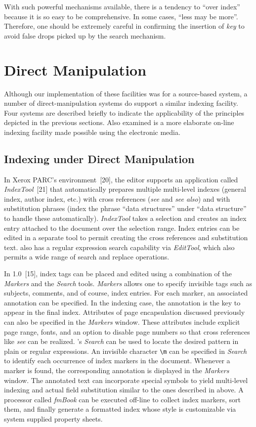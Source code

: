 With such powerful mechanisms available, there is a tendency to ``over index''
because it is so easy to be comprehensive.
In some cases, ``less may be more''.  Therefore, one should be extremely
careful in confirming the insertion of {\it key\/}
to avoid false drops picked up by the search mechanism.


\section{Direct Manipulation}
Although our implementation of these facilities was for a source-based system,
a number of direct-manipulation systems do support a similar indexing facility.
Four systems are described briefly to indicate
the applicability of the principles depicted in the previous sections.
Also examined is a more elaborate on-line
indexing facility made possible using the electronic media.


\subsection{Indexing under Direct Manipulation}
In Xerox PARC's {\CD} environment~[20],
the {\TG} editor supports an
application called {\sl IndexTool\/}~[21]
that automatically prepares multiple
multi-level indexes (general index, author index, etc.) with cross
references ({\it see\/} and {\it see also\/})
and with substitution phrases (index the
phrase ``data structures'' under ``data structure'' to handle these
automatically).  {\sl IndexTool\/} takes a selection and creates an
index entry attached to the document over the selection range.  Index
entries can be edited in a separate tool to permit creating the cross
references and substitution text.  {\TG} also has a regular expression search
capability via {\sl EditTool\/}, which also
permits a wide range of search and replace operations.

In {\FM} 1.0~[15], index tags can be placed and edited
using a combination of the {\sl Markers\/} and the {\sl Search\/} tools.
{\sl Markers\/} allows one to specify invisible tags such as
subjects, comments, and of course, index entries.
For each marker, an associated annotation can be specified.
In the indexing case, the annotation is the key to appear in the final index.
Attributes of page encapsulation discussed previously can also be specified
in the {\sl Markers\/} window.
These attributes include explicit page range, fonts, and an option to disable
page numbers so that cross references like {\it see\/} can be realized.
{\FM}'s {\sl Search\/} can be used to locate the desired pattern in plain
or regular expressions.  An invisible character \verb|\m|
can be specified in {\sl Search\/} to identify each occurrence
of index markers in the document.
Whenever a marker is found, the corresponding
annotation is displayed in the {\sl Markers\/} window.
The annotated text can incorporate special symbols to yield
multi-level indexing and actual field substitution similar to the ones
described in above.  A processor called
{\sl fmBook\/} can be executed off-line to collect index markers,
sort them, and finally generate a formatted index whose style
is customizable via system supplied property sheets.

